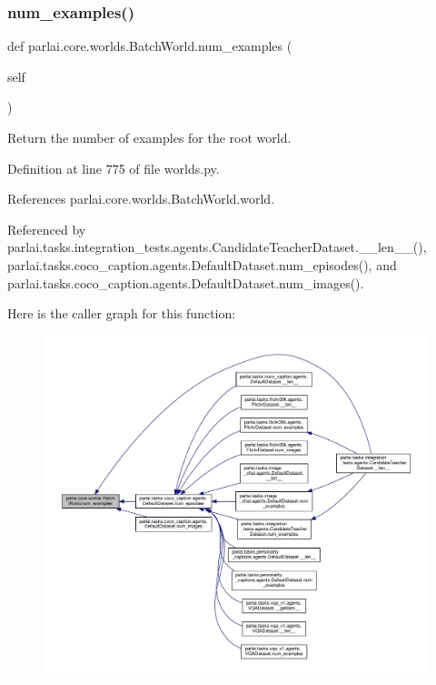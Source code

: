 \subsubsection{\texorpdfstring{num\+\_\+examples()}{num\_examples()}}
{\footnotesize\ttfamily def parlai.\+core.\+worlds.\+Batch\+World.\+num\+\_\+examples (\begin{DoxyParamCaption}\item[{}]{self }\end{DoxyParamCaption})}

\begin{DoxyVerb}Return the number of examples for the root world.\end{DoxyVerb}
 

Definition at line 775 of file worlds.\+py.



References parlai.\+core.\+worlds.\+Batch\+World.\+world.



Referenced by parlai.\+tasks.\+integration\+\_\+tests.\+agents.\+Candidate\+Teacher\+Dataset.\+\_\+\+\_\+len\+\_\+\+\_\+(), parlai.\+tasks.\+coco\+\_\+caption.\+agents.\+Default\+Dataset.\+num\+\_\+episodes(), and parlai.\+tasks.\+coco\+\_\+caption.\+agents.\+Default\+Dataset.\+num\+\_\+images().

Here is the caller graph for this function\+:
\nopagebreak
\begin{figure}[H]
\begin{center}
\leavevmode
\includegraphics[width=350pt]{classparlai_1_1core_1_1worlds_1_1BatchWorld_a047736ed3867bf7631af02f8eb0528d8_icgraph}
\end{center}
\end{figure}
\mbox{\label{classparlai_1_1core_1_1worlds_1_1BatchWorld_a297ab42faba47581774cd9333c874905}} 
